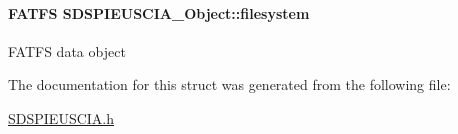 \paragraph[{filesystem}]{\setlength{\rightskip}{0pt plus 5cm}F\+A\+T\+F\+S S\+D\+S\+P\+I\+E\+U\+S\+C\+I\+A\+\_\+\+Object\+::filesystem}\label{struct_s_d_s_p_i_e_u_s_c_i_a___object_a3e10853e7c79a7b99d481353cbd71739}
F\+A\+T\+F\+S data object 

The documentation for this struct was generated from the following file\+:\begin{DoxyCompactItemize}
\item 
\hyperlink{_s_d_s_p_i_e_u_s_c_i_a_8h}{S\+D\+S\+P\+I\+E\+U\+S\+C\+I\+A.\+h}\end{DoxyCompactItemize}
